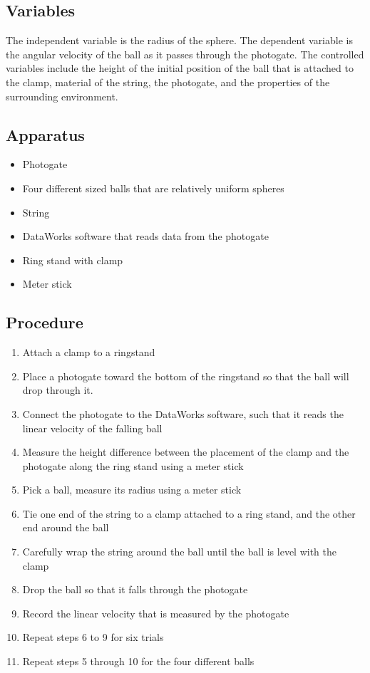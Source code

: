 \documentclass[10pt, letterpaper]{article}
\begin{document}
    \subsection{Variables}
    The independent variable is the radius of the sphere. The dependent variable is the
    angular velocity of the ball as it passes through the photogate. The controlled variables
    include the height of the initial position of the ball that is attached to the clamp,
    material of the string, the photogate, and the properties of the surrounding environment.

    \subsection{Apparatus}
    \begin{itemize}
      \item Photogate
      \item Four different sized balls that are relatively uniform spheres
      \item String
      \item DataWorks software that reads data from the photogate
      \item Ring stand with clamp
      \item Meter stick
    \end{itemize}

    \subsection{Procedure}
    \begin{enumerate}
      \item Attach a clamp to a ringstand
      \item Place a photogate toward the bottom of the ringstand so that the ball will drop through it.
      \item Connect the photogate to the DataWorks software, such that it reads the linear velocity of the falling ball
      \item Measure the height difference between the placement of the clamp and the photogate along the ring stand using a meter stick
      \item Pick a ball, measure its radius using a meter stick
      \item Tie one end of the string to a clamp attached to a ring stand, and the other end around the ball
      \item Carefully wrap the string around the ball until the ball is level with the clamp
      \item Drop the ball so that it falls through the photogate
      \item Record the linear velocity that is measured by the photogate
      \item Repeat steps 6 to 9 for six trials
      \item Repeat steps 5 through 10 for the four different balls
    \end{enumerate}
\end{document}
